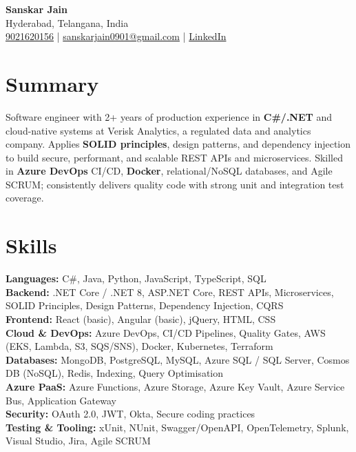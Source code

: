 \documentclass[letterpaper,10pt]{article}
\begin{document}
\begin{center}
    {\LARGE \textbf{Sanskar Jain}} \\
    Hyderabad, Telangana, India \\
    \href{tel:9021620156}{9021620156} \;|\;
    \href{mailto:sanskarjain0901@gmail.com}{sanskarjain0901@gmail.com} \;|\;
    \href{https://www.linkedin.com/in/sanskar-jain0901/}{LinkedIn}
\end{center}

\vspace{3pt}

\section*{Summary}
Software engineer with 2+ years of production experience in \textbf{C\#/.NET} and cloud-native systems at Verisk Analytics, a regulated data and analytics company.
Applies \textbf{SOLID principles}, design patterns, and dependency injection to build secure, performant, and scalable REST APIs and microservices.
Skilled in \textbf{Azure DevOps} CI/CD, \textbf{Docker}, relational/NoSQL databases, and Agile SCRUM; consistently delivers quality code with strong unit and integration test coverage.

\section*{Skills}
\textbf{Languages:} C\#, Java, Python, JavaScript, TypeScript, SQL \\
\textbf{Backend:} .NET Core / .NET 8, ASP.NET Core, REST APIs, Microservices, SOLID Principles, Design Patterns, Dependency Injection, CQRS \\
\textbf{Frontend:} React (basic), Angular (basic), jQuery, HTML, CSS \\
\textbf{Cloud \& DevOps:} Azure DevOps, CI/CD Pipelines, Quality Gates, AWS (EKS, Lambda, S3, SQS/SNS), Docker, Kubernetes, Terraform \\
\textbf{Databases:} MongoDB, PostgreSQL, MySQL, Azure SQL / SQL Server, Cosmos DB (NoSQL), Redis, Indexing, Query Optimisation \\
\textbf{Azure PaaS:} Azure Functions, Azure Storage, Azure Key Vault, Azure Service Bus, Application Gateway \\
\textbf{Security:} OAuth 2.0, JWT, Okta, Secure coding practices \\
\textbf{Testing \& Tooling:} xUnit, NUnit, Swagger/OpenAPI, OpenTelemetry, Splunk, Visual Studio, Jira, Agile SCRUM
\end{document}
